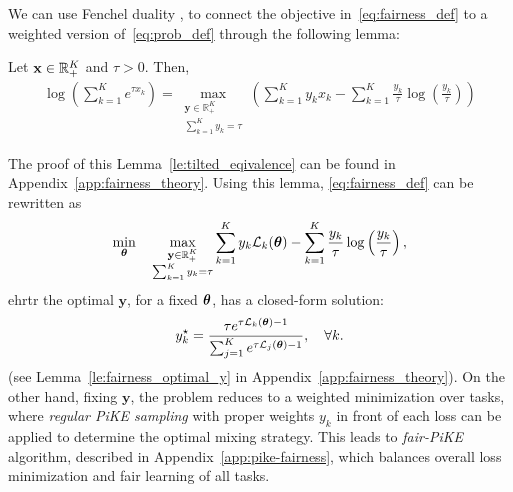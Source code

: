 We can use Fenchel duality \citep{rockafellar2015convex}, to connect the objective in~\eqref{eq:fairness_def} to a weighted version of~\eqref{eq:prob_def} through the following lemma:
\begin{lemma}\label{le:main_body_equivalence}
Let $\mathbf{x} \in \mathbb{R}_{+}^K$ and $\tau> 0$. Then,
{\small
\begin{align}
     \log \left(\sum_{k=1}^K e^{\tau x_k}\right) =\max _{\substack{\mathbf{y} \in \mathbb{R}_{+}^K \\ \sum_{k=1}^K y_k=\tau}}\left(\sum_{k=1}^K y_k x_k-\sum_{k=1}^K \frac{y_k}{\tau} \log \left(\frac{y_k}{\tau}\right)\right) \nonumber
\end{align}
}
\end{lemma}
The proof of this Lemma~\ref{le:tilted_eqivalence}  can be found in Appendix~\ref{app:fairness_theory}. Using this lemma, \eqref{eq:fairness_def} can be rewritten as 
\vspace{-0.2cm}
\begin{align}
    \min_{\bm{\theta}} \quad \max_{\substack{\mathbf{y} \in \mathbb{R}_{+}^K \\ \sum_{k=1}^K y_k=\tau}} \sum^K_{k=1} y_k\mathcal{L}_k(\bm{\theta}) - \sum^K_{k=1} \frac{y_k}{\tau} \log \left(\frac{y_k}{\tau} \right), \nonumber
\end{align}  
ehrtr the optimal \(\mathbf{y}\), for a fixed \(\bm{\theta}\), has a closed-form solution:  
\[
y_k^\star = \frac{\tau e^{\tau\mathcal{L}_k(\bm{\theta})-1}}{\sum^K_{j=1} e^{\tau\mathcal{L}_j(\bm{\theta}) -1}}, \quad \forall k.
\]  
(see Lemma~\ref{le:fairness_optimal_y} in Appendix~\ref{app:fairness_theory}). On the other hand, fixing \(\mathbf{y}\), the problem reduces to a weighted minimization over tasks, where \textit{regular PiKE sampling} with proper weights $y_k$ in front of each loss can be applied to determine the optimal mixing strategy.  
This leads to \textit{fair-PiKE} algorithm, described in Appendix~\ref{app:pike-fairness}, which balances overall loss minimization and fair learning of all tasks.  




%
%
%
%
%
%

%
%
%
%
%
%
%
%
%
%
%
%
%
%








